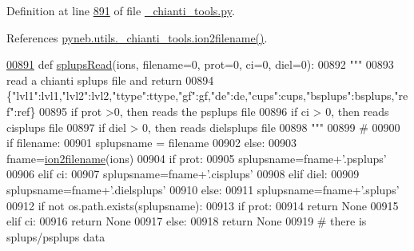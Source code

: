 Definition at line \hyperlink{__chianti__tools_8py_source_l00891}{891} of file \hyperlink{__chianti__tools_8py_source}{\+\_\+chianti\+\_\+tools.\+py}.



References \hyperlink{__chianti__tools_8py_source_l00396}{pyneb.\+utils.\+\_\+chianti\+\_\+tools.\+ion2filename()}.


\begin{DoxyCode}
\hypertarget{namespacepyneb_1_1utils_1_1__chianti__tools_l00891}{}\hyperlink{namespacepyneb_1_1utils_1_1__chianti__tools_a6e5e0d51ad5dd162d51353c6d2e49d3b}{00891} \textcolor{keyword}{def }\hyperlink{namespacepyneb_1_1utils_1_1__chianti__tools_a6e5e0d51ad5dd162d51353c6d2e49d3b}{splupsRead}(ions, filename=0, prot=0, ci=0,  diel=0):
00892     \textcolor{stringliteral}{"""}
00893 \textcolor{stringliteral}{    read a chianti splups file and return}
00894 \textcolor{stringliteral}{    \{"lvl1":lvl1,"lvl2":lvl2,"ttype":ttype,"gf":gf,"de":de,"cups":cups,"bsplups":bsplups,"ref":ref\}}
00895 \textcolor{stringliteral}{    if prot >0, then reads the psplups file}
00896 \textcolor{stringliteral}{    if ci > 0, then reads cisplups file}
00897 \textcolor{stringliteral}{    if diel > 0, then reads dielsplups file}
00898 \textcolor{stringliteral}{    """}
00899     \textcolor{comment}{#}
00900     \textcolor{keywordflow}{if} filename:
00901         splupsname = filename
00902     \textcolor{keywordflow}{else}:
00903         fname=\hyperlink{namespacepyneb_1_1utils_1_1__chianti__tools_ad4bc7b577fd4c3819ceb00b0a444351b}{ion2filename}(ions)
00904         \textcolor{keywordflow}{if} prot:
00905             splupsname=fname+\textcolor{stringliteral}{'.psplups'}
00906         \textcolor{keywordflow}{elif} ci:
00907             splupsname=fname+\textcolor{stringliteral}{'.cisplups'}
00908         \textcolor{keywordflow}{elif} diel:
00909             splupsname=fname+\textcolor{stringliteral}{'.dielsplups'}
00910         \textcolor{keywordflow}{else}:
00911             splupsname=fname+\textcolor{stringliteral}{'.splups'}
00912     \textcolor{keywordflow}{if} \textcolor{keywordflow}{not} os.path.exists(splupsname):
00913         \textcolor{keywordflow}{if} prot:
00914             \textcolor{keywordflow}{return} \textcolor{keywordtype}{None}
00915         \textcolor{keywordflow}{elif} ci:
00916             \textcolor{keywordflow}{return} \textcolor{keywordtype}{None}
00917         \textcolor{keywordflow}{else}:
00918             \textcolor{keywordflow}{return} \textcolor{keywordtype}{None}
00919     \textcolor{comment}{# there is splups/psplups data}

\end{DoxyCode}
